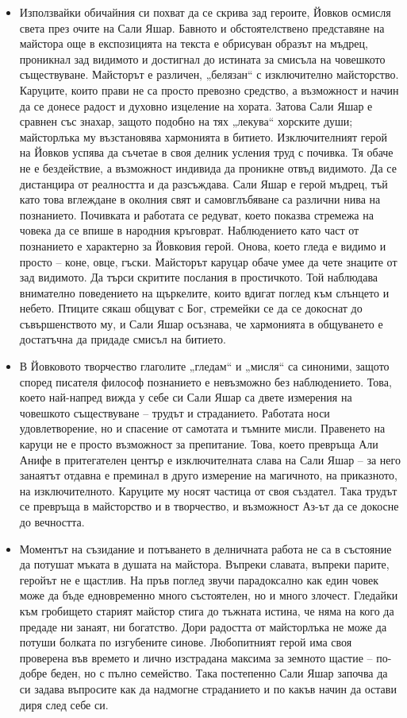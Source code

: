 \documentclass[12pt,a4paper]{article}
\begin{document}
\begin{itemize}[leftmargin=*, noitemsep, topsep=2pt, parsep=0pt]
    \item Използвайки обичайния си похват да се скрива зад героите, Йовков осмисля света през очите на Сали Яшар. Бавното и обстоятелствено представяне на майстора още в експозицията на текста е обрисуван образът на мъдрец, проникнал зад видимото и достигнал до истината за смисъла на човешкото съществуване. Майсторът е различен, „белязан“ с изключително майсторство. Каруците, които прави не са просто превозно средство, а възможност и начин да се донесе радост и духовно изцеление на хората. Затова Сали Яшар е сравнен със знахар, защото подобно на тях „лекува“ хорските души; майсторлъка му възстановява хармонията в битието. Изключителният герой на Йовков успява да съчетае в своя делник усления труд с почивка. Тя обаче не е бездействие, а възможност индивида да проникне отвъд видимото. Да се дистанцира от реалността и да разсъждава. Сали Яшар е герой мъдрец, тъй като това вглеждане в околния свят и самовглъбяване са различни нива на познанието. Почивката и работата се редуват, което показва стремежа на човека да се впише в народния кръговрат. Наблюдението като част от познанието е характерно за Йовковия герой. Онова, което гледа е видимо и просто -- коне, овце, гъски. Майсторът каруцар обаче умее да чете знаците от зад видимото. Да търси скритите послания в простичкото. Той наблюдава внимателно поведението на щъркелите, които вдигат поглед към слънцето и небето. Птиците сякаш общуват с Бог, стремейки се да се докоснат до съвършенството му, и Сали Яшар осъзнава, че хармонията в общуването е достатъчна да придаде смисъл на битието.
    \vspace{0.1cm}
    \item В Йовковото творчество глаголите „гледам“ и „мисля“ са синоними, защото според писателя философ познанието е невъзможно без наблюдението. Това, което най-напред вижда у себе си Сали Яшар са двете измерения на човешкото съществуване -- трудът и страданието. Работата носи удовлетворение, но и спасение от самотата и тъмните мисли. Правенето на каруци не е просто възможност за препитание. Това, което превръща Али Анифе в притегателен център е изключителната слава на Сали Яшар -- за него занаятът отдавна е преминал в друго измерение на магичното, на приказното, на изключителното. Каруците му носят частица от своя създател. Така трудът се превръща в майсторство и в творчество, и възможност Аз-ът да се докосне до вечността.
    \vspace{0.1cm}
    \item Моментът на съзидание и потъването в делничната работа не са в състояние да потушат мъката в душата на майстора. Въпреки славата, въпреки парите, геройът не е щастлив. На пръв поглед звучи парадоксално как един човек може да бъде едновременно много състоятелен, но и много злочест. Гледайки към гробището старият майстор стига до тъжната истина, че няма на кого да предаде ни занаят, ни богатство. Дори радостта от майсторлъка не може да потуши болката по изгубените синове. Любопитният герой има своя проверена във времето и лично изстрадана максима за земното щастие -- по-добре беден, но с пълно семейство. Така постепенно Сали Яшар започва да си задава въпросите как да надмогне страданието и по какъв начин да остави диря след себе си.

\end{itemize}
\end{document}

